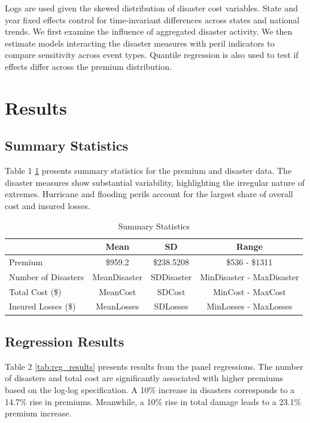 \documentclass[12pt]{article}
\begin{document}
Logs are used given the skewed distribution of disaster cost variables. State and year fixed effects control for time-invariant 
differences across states and national trends. We first examine the influence of aggregated disaster activity. We then estimate 
models interacting the disaster measures with peril indicators to compare sensitivity across event types. Quantile regression is 
also used to test if effects differ across the premium distribution.



\section{Results}
\label{sec:resu}
\subsection{Summary Statistics}
Table 1 \ref{tab:summary} presents summary statistics for the premium and disaster data. The disaster measures show substantial variability, 
highlighting the irregular nature of extremes. Hurricane and flooding perils account for the largest share of overall cost and 
insured losses.

\begin{table}[h]
    \label{tab:summary}
    \centering
    \begin{tabular}{|l|c|c|c|}
        \hline
        & Mean & SD & Range \\
        \hline
        Premium & \$\num{959.2} & \$\num{238.5208} & \$\num{536} - \$\num{1311} \\
        Number of Disasters & MeanDisaster & SDDisaster & MinDisaster - MaxDisaster \\
        Total Cost (\$) & MeanCost & SDCost & MinCost - MaxCost \\
        Insured Losses (\$) & MeanLosses & SDLosses & MinLosses - MaxLosses \\
        \hline
    \end{tabular}
    \caption{Summary Statistics}
\end{table}

\subsection{Regression Results}
Table 2 \ref{tab:reg_results} presents results from the panel regressions. The number of disasters and total cost are significantly associated with 
higher premiums based on the log-log specification. A 10\% increase in disasters corresponds to a 14.7\% rise in premiums. Meanwhile, 
a 10\% rise in total damage leads to a 23.1\% premium increase.
\end{document}
